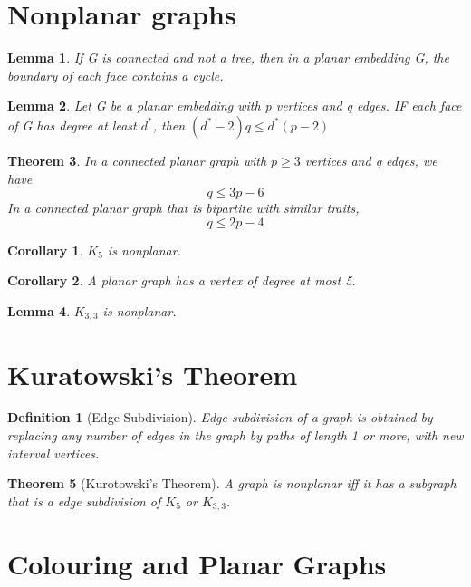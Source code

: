 \documentclass[11pt, oneside]{book}
\theoremstyle{break}
\newtheorem{thm}{Theorem}[section]
\newtheorem{crly}{Corollary}[thm]
\newtheorem{lemma}[thm]{Lemma}
\newtheorem{defn}{Definition}[section]
\begin{document}
\section{Nonplanar graphs}

\begin{lemma}
	If G is connected and not a tree, then in a planar embedding G, the boundary of each face contains a cycle.
\end{lemma}

\begin{lemma}
	Let G be a planar embedding with p vertices and q edges. IF each face of G has degree at least $d^*$, then $(d^* - 2)q \leq d^*(p-2)$
\end{lemma}

\begin{thm}
	In a connected planar graph with $p \geq 3$ vertices and q edges, we have
	\[
		q \leq 3p - 6
	\]
	In a connected planar graph that is bipartite with similar traits,
	\[
		q \leq 2p - 4
	\]
\end{thm}

\begin{crly}
	$K_5$ is nonplanar.
\end{crly}

\begin{crly}
	A planar graph has a vertex of degree at most 5.
\end{crly}

\begin{lemma}
	$K_{3, 3}$ is nonplanar.
\end{lemma}


\section{Kuratowski's Theorem}

\begin{defn}[Edge Subdivision]
	Edge subdivision of a graph is obtained by replacing any number of edges in the graph by paths of length 1 or more, with new interval vertices.
\end{defn}

\begin{thm}[Kurotowski's Theorem]
	A graph is nonplanar iff it has a subgraph that is a edge subdivision of $K_5$ or $K_{3, 3}$.
\end{thm}


\section{Colouring and Planar Graphs}
\end{document}
